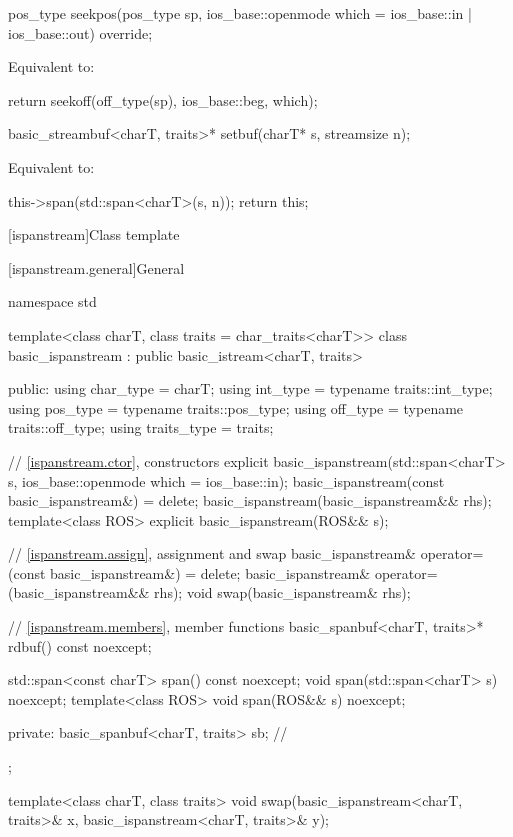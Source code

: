 %
\begin{itemdecl}
pos_type seekpos(pos_type sp, ios_base::openmode which = ios_base::in | ios_base::out) override;
\end{itemdecl}

\begin{itemdescr}
\pnum
\effects
Equivalent to:
\begin{codeblock}
return seekoff(off_type(sp), ios_base::beg, which);
\end{codeblock}
\end{itemdescr}

%
\begin{itemdecl}
basic_streambuf<charT, traits>* setbuf(charT* s, streamsize n);
\end{itemdecl}

\begin{itemdescr}
\pnum
\effects
Equivalent to:
\begin{codeblock}
this->span(std::span<charT>(s, n));
return this;
\end{codeblock}
\end{itemdescr}

[ispanstream]{Class template }

[ispanstream.general]{General}

%
\begin{codeblock}
namespace std {
  template<class charT, class traits = char_traits<charT>>
  class basic_ispanstream
    : public basic_istream<charT, traits> {
  public:
    using char_type   = charT;
    using int_type    = typename traits::int_type;
    using pos_type    = typename traits::pos_type;
    using off_type    = typename traits::off_type;
    using traits_type = traits;

    // \ref{ispanstream.ctor}, constructors
    explicit basic_ispanstream(std::span<charT> s,
                               ios_base::openmode which = ios_base::in);
    basic_ispanstream(const basic_ispanstream&) = delete;
    basic_ispanstream(basic_ispanstream&& rhs);
    template<class ROS> explicit basic_ispanstream(ROS&& s);

    // \ref{ispanstream.assign}, assignment and swap
    basic_ispanstream& operator=(const basic_ispanstream&) = delete;
    basic_ispanstream& operator=(basic_ispanstream&& rhs);
    void swap(basic_ispanstream& rhs);

    // \ref{ispanstream.members}, member functions
    basic_spanbuf<charT, traits>* rdbuf() const noexcept;

    std::span<const charT> span() const noexcept;
    void span(std::span<charT> s) noexcept;
    template<class ROS> void span(ROS&& s) noexcept;

  private:
    basic_spanbuf<charT, traits> sb;    // \expos
  };

  template<class charT, class traits>
    void swap(basic_ispanstream<charT, traits>& x, basic_ispanstream<charT, traits>& y);
}
\end{codeblock}

